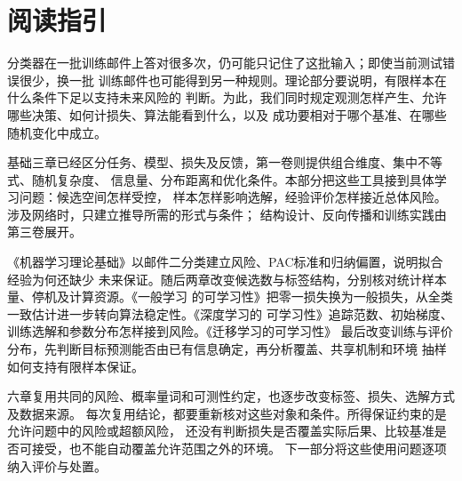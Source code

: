 \chapter*{阅读指引}

分类器在一批训练邮件上答对很多次，仍可能只记住了这批输入；即使当前测试错误很少，换一批
训练邮件也可能得到另一种规则。理论部分要说明，有限样本在什么条件下足以支持未来风险的
判断。为此，我们同时规定观测怎样产生、允许哪些决策、如何计损失、算法能看到什么，以及
成功要相对于哪个基准、在哪些随机变化中成立。

基础三章已经区分任务、模型、损失及反馈，第一卷则提供组合维度、集中不等式、随机复杂度、
信息量、分布距离和优化条件。本部分把这些工具接到具体学习问题：候选空间怎样受控，
样本怎样影响选解，经验评价怎样接近总体风险。涉及网络时，只建立推导所需的形式与条件；
结构设计、反向传播和训练实践由第三卷展开。

《机器学习理论基础》以邮件二分类建立风险、PAC标准和归纳偏置，说明拟合经验为何还缺少
未来保证。随后两章改变候选数与标签结构，分别核对统计样本量、停机及计算资源。《一般学习
的可学习性》把零一损失换为一般损失，从全类一致估计进一步转向算法稳定性。《深度学习的
可学习性》追踪范数、初始梯度、训练选解和参数分布怎样接到风险。《迁移学习的可学习性》
最后改变训练与评价分布，先判断目标预测能否由已有信息确定，再分析覆盖、共享机制和环境
抽样如何支持有限样本保证。

六章复用共同的风险、概率量词和可测性约定，也逐步改变标签、损失、选解方式及数据来源。
每次复用结论，都要重新核对这些对象和条件。所得保证约束的是允许问题中的风险或超额风险，
还没有判断损失是否覆盖实际后果、比较基准是否可接受，也不能自动覆盖允许范围之外的环境。
下一部分将这些使用问题逐项纳入评价与处置。
